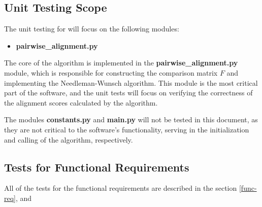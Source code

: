 \documentclass[12pt, titlepage]{article}
\begin{document}

\subsection{Unit Testing Scope}

The unit testing for \progname{} will focus on the following modules:
\begin{itemize}
  \item \textbf{pairwise\_alignment.py}
\end{itemize}

The core of the algorithm is implemented in the \textbf{pairwise\_alignment.py} module, 
which is responsible for constructing the comparison matrix $F$ and implementing the Needleman-Wunsch algorithm.
 This module is the most critical part of the software, and the unit tests will focus on verifying the correctness 
 of the alignment scores calculated by the algorithm. 

The modules \textbf{constants.py} and \textbf{main.py} will not be tested in this document, 
as they are not critical to the software's functionality, serving in the initialization and  
calling of the algorithm, respectively.


\subsection{Tests for Functional Requirements}

All of the tests for the functional requirements are described in the section \autoref{func-req}, and 
\end{document}
